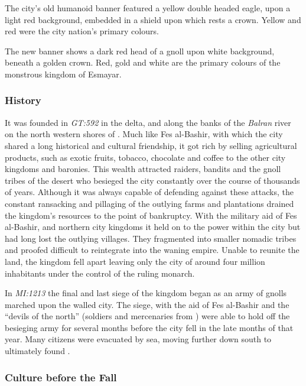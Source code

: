 The city's old humanoid banner featured a yellow double headed eagle, upon a
light red background, embedded in a shield upon which rests a crown. Yellow
and red were the city nation's primary colours.

The new banner shows a dark red head of a gnoll upon white background, beneath
a golden crown. Red, gold and white are the primary colours of the monstrous
kingdom of Esmayar.

\subsubsection{History}

It was founded in \emph{GT:592} in the delta, and along the banks of the
\emph{Balran} river on the north western shores of . Much
like Fes al-Bashir, with which the city shared a long historical and cultural
friendship, it got rich by selling agricultural products, such as exotic
fruits, tobacco, chocolate and coffee to the other city kingdoms and
baronies. This wealth attracted raiders, bandits and the gnoll tribes of the
desert who besieged the city constantly over the course of thousands of
years. Although it was always capable of defending against these attacks, the
constant ransacking and pillaging of the outlying farms and plantations
drained the kingdom's resources to the point of bankruptcy. With the military
aid of Fes al-Bashir, and northern city kingdoms it held on to the power within
the city but had long lost the outlying villages. They fragmented into smaller
nomadic tribes and proofed difficult to reintegrate into the waning
empire. Unable to reunite the land, the kingdom fell apart leaving only the
city of around four million inhabitants under the control of the ruling
monarch.

In \emph{MI:1213} the final and last siege of the kingdom began as an army of
gnolls marched upon the walled city. The siege, with the aid of Fes al-Bashir
and the ``devils of the north'' (soldiers and mercenaries from
) were able to hold off the besieging army for several
months before the city fell in the late months of that year. Many citizens
were evacuated by sea, moving further down south to ultimately found
.

\subsubsection{Culture before the Fall}


